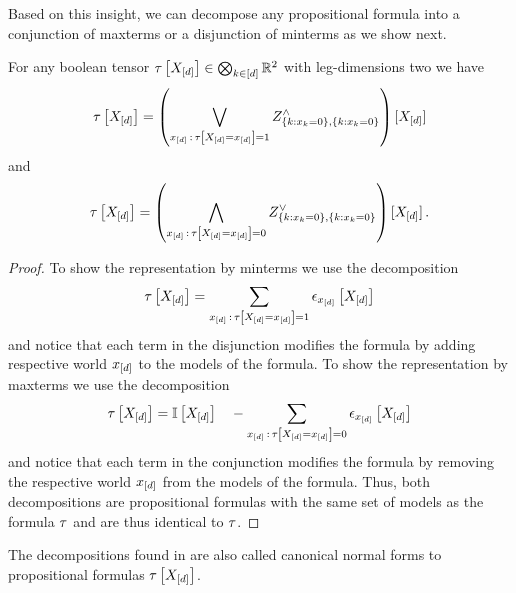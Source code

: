 Based on this insight, we can decompose any propositional formula into a conjunction of maxterms or a disjunction of minterms as we show next.

\begin{theorem}\label{the:tensorToMaxMinTerms}
	For any boolean tensor $\tau\left[X_{[d]}\right]\in\bigotimes_{k\in[d]}\mathbb{R}^2$ with leg-dimensions two we have
	\begin{align*}
		\tau\left[X_{[d]}\right] = \left( \bigvee_{x_{[d]} \, : \, \tau\left[X_{[d]}=x_{[d]}\right] = 1} 
		Z^{\land}_{\{k : x_{k}=0\},\{k : x_{k}=0\}} 
		\right)
		[X_{[d]}] 
	\end{align*}
	and
	\begin{align*}
		\tau\left[X_{[d]}\right] = \left( \bigwedge_{x_{[d]} \, : \, \tau\left[X_{[d]}=x_{[d]}\right] = 0} 
		Z^{\lor}_{\{k : x_{k}=0\},\{k : x_{k}=0\}} 
		\right)
		[X_{[d]}] \, .
	\end{align*}
\end{theorem}
\begin{proof}
	To show the representation by minterms we use the decomposition
	\begin{align*}
		\tau\left[X_{[d]}\right]  = \sum_{x_{[d]} \, : \, \tau\left[X_{[d]}=x_{[d]}\right] = 1} \epsilon_{x_{[d]}}\left[X_{[d]}\right]
	\end{align*}
	and notice that each term in the disjunction modifies the formula by adding respective world $x_{[d]}$ to the models of the formula.
	To show the representation by maxterms we use the decomposition
	\begin{align*}
		\tau\left[X_{[d]}\right]  = \mathbb{I}\left[X_{[d]}\right] \quad - \sum_{x_{[d]} \, : \, \tau\left[X_{[d]}=x_{[d]}\right] = 0} \epsilon_{x_{[d]}}\left[X_{[d]}\right]
	\end{align*}
	and notice that each term in the conjunction modifies the formula by removing the respective world $x_{[d]}$ from the models of the formula.	
	Thus, both decompositions are propositional formulas with the same set of models as the formula $\tau$ and are thus identical to $\tau$.
\end{proof}


The decompositions found in  are also called canonical normal forms to propositional formulas $\tau\left[X_{[d]}\right]$.

